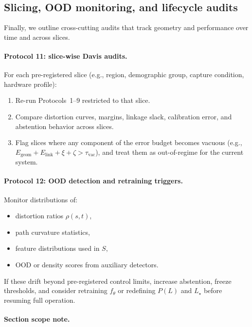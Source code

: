\documentclass[11pt]{article}
\begin{document}
\subsection{Slicing, OOD monitoring, and lifecycle audits}

Finally, we outline cross-cutting audits that track geometry and performance
over time and across slices.

\paragraph{Protocol 11: slice-wise Davis audits.}

For each pre-registered slice (e.g., region, demographic group, capture
condition, hardware profile):

\begin{enumerate}[label=(\arabic*)]
\item Re-run Protocols~1–9 restricted to that slice.
\item Compare distortion curves, margins, linkage slack, calibration error,
  and abstention behavior across slices.
\item Flag slices where any component of the error budget becomes vacuous
  (e.g., $E_{\mathrm{geom}} + E_{\mathrm{link}} + \xi + \zeta > \tau_{\mathrm{vac}}$),
  and treat them as out-of-regime for the current system.
\end{enumerate}

\paragraph{Protocol 12: OOD detection and retraining triggers.}

Monitor distributions of:
\begin{itemize}
\item distortion ratios $\rho(s,t)$,
\item path curvature statistics,
\item feature distributions used in $S$,
\item OOD or density scores from auxiliary detectors.
\end{itemize}
If these drift beyond pre-registered control limits, increase abstention,
freeze thresholds, and consider retraining $f_\theta$ or redefining
$P(L)$ and $L_\star$ before resuming full operation.

\paragraph{Section scope note.}
\end{document}
